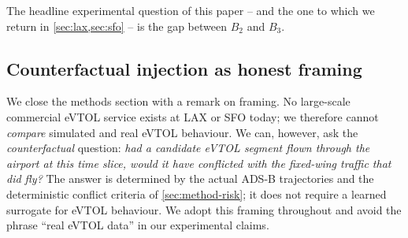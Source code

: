 The headline experimental question of this paper -- and the one to which we
return in \cref{sec:lax,sec:sfo} -- is the gap between $B_2$ and $B_3$.

\subsection{Counterfactual injection as honest framing}
\label{sec:method-counterfactual}

We close the methods section with a remark on framing. No large-scale
commercial eVTOL service exists at LAX or SFO today; we therefore cannot
\emph{compare} simulated and real eVTOL behaviour. We can, however, ask the
\emph{counterfactual} question: \textit{had a candidate eVTOL segment flown
through the airport at this time slice, would it have conflicted with the
fixed-wing traffic that did fly?} The answer is determined by the actual
ADS-B trajectories and the deterministic conflict criteria of
\cref{sec:method-risk}; it does not require a learned surrogate for eVTOL
behaviour. We adopt this framing throughout and avoid the phrase ``real
eVTOL data'' in our experimental claims.
